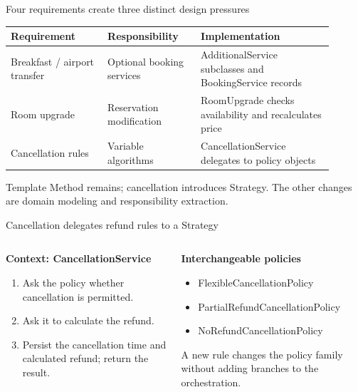 \documentclass[aspectratio=169,11pt]{beamer}
\begin{document}
\begin{frame}{Four requirements create three distinct design pressures}
\begin{tabular}{L{0.27\linewidth}L{0.26\linewidth}L{0.37\linewidth}}
\toprule Requirement & Responsibility & Implementation\\\midrule
Breakfast / airport transfer & Optional booking services & AdditionalService subclasses and BookingService records\\[0.18cm]
Room upgrade & Reservation modification & RoomUpgrade checks availability and recalculates price\\[0.18cm]
Cancellation rules & Variable algorithms & CancellationService delegates to policy objects\\\bottomrule
\end{tabular}\par
\vspace{0.3cm}
Template Method remains; cancellation introduces Strategy. The other changes are domain modeling and responsibility extraction.
\end{frame}
\begin{frame}{Cancellation delegates refund rules to a Strategy}
\begin{columns}[T]
\begin{column}{0.48\textwidth}
\textbf{Context: CancellationService}
\begin{enumerate}
\item Ask the policy whether cancellation is permitted.
\item Ask it to calculate the refund.
\item Persist the cancellation time and calculated refund; return the result.
\end{enumerate}
\end{column}
\begin{column}{0.48\textwidth}
\textbf{Interchangeable policies}
\begin{itemize}
\item FlexibleCancellationPolicy
\item PartialRefundCancellationPolicy
\item NoRefundCancellationPolicy
\end{itemize}
A new rule changes the policy family without adding branches to the orchestration.
\end{column}
\end{columns}
\end{frame}
\end{document}
